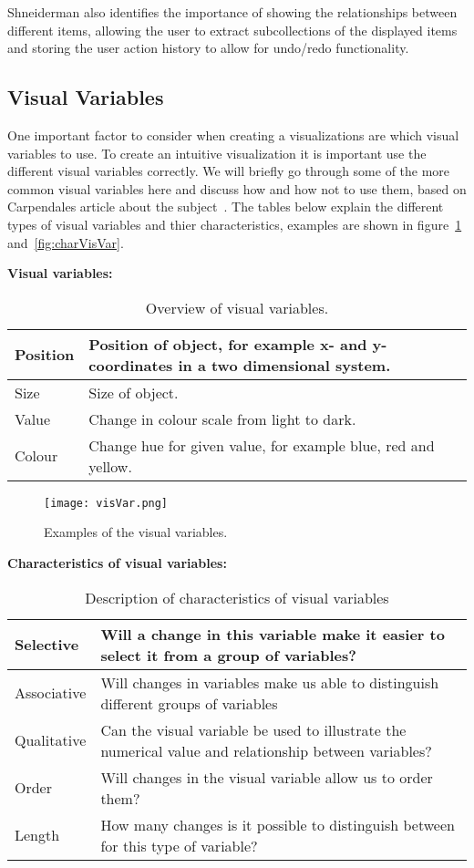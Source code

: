 Shneiderman also identifies the importance of showing the relationships between different items, allowing the user to extract subcollections of the displayed items and storing the user action history to allow for undo/redo functionality.

\subsection{Visual Variables} 
One important factor to consider when creating a visualizations are which visual variables to use. To create an intuitive visualization it is important use the different visual variables correctly. We will briefly go through some of the more common visual variables here and discuss how and how not to use them, based on Carpendales article about the subject~\cite{carpendale}. The tables below explain the different types of visual variables and thier characteristics, examples are shown in figure~\ref{fig:visVar} and~\ref{fig:charVisVar}.

\textbf{Visual variables:}
\begin{table}[h!]
  \begin{tabular}{|l|p{10cm}|}
      \hline
      Position    & Position of object, for example x- and y-coordinates in a two dimensional system. \\ \hline
      Size        & Size of object. \\ \hline
      Value       & Change in colour scale from light to dark. \\ \hline
      Colour      & Change hue for given value, for example blue, red and yellow. \\ \hline
  \end{tabular}
  \caption{Overview of visual variables.}
\end{table}

\begin{figure}[h!]
	\centering
		\texttt{[image: visVar.png]}
		\caption{\footnotesize Examples of the visual variables.}
		\label{fig:visVar}
\end{figure}

\textbf{Characteristics of visual variables:}
\begin{table}[h!]
  \begin{tabular}{|l|p{10cm}|}
      \hline
      Selective   & Will a change in this variable make it easier to select it from a group of variables? \\ \hline
        Associative & Will changes in variables make us able to distinguish different groups of variables \\ \hline 
        Qualitative & Can the visual variable be used to illustrate the numerical value and relationship between variables? \\ \hline
        Order       & Will changes in the visual variable allow us to order them? \\ \hline
        Length      & How many changes is it possible to distinguish between for this type of variable? \\ \hline
    \end{tabular}
    \caption{Description of characteristics of visual variables}
\end{table}

